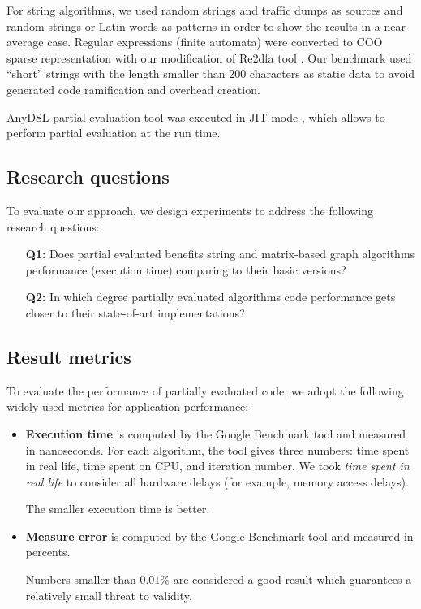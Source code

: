 \documentclass[conference]{IEEEtran}
\begin{document}
For string algorithms, we used random strings and traffic dumps as sources and random strings or Latin words as patterns in order to show the results in a near-average case. Regular expressions (finite automata) were converted to COO sparse representation with our modification of Re2dfa tool \cite{re2dfa}. Our benchmark used ``short'' strings with the length smaller than 200 characters as static data to avoid generated code ramification and overhead creation.

AnyDSL partial evaluation tool was executed in JIT-mode \cite{leissa2018anydsl}, which allows to perform partial evaluation at the run time.



\subsection{Research questions}

To evaluate our approach, we design experiments to address the following research questions:

\begin{itemize}
	\item[\textbf{Q1:}] Does partial evaluated benefits string and matrix-based graph algorithms performance (execution time) comparing to their basic versions?
	\item[\textbf{Q2:}] In which degree partially evaluated algorithms code performance gets closer to their state-of-art implementations?
\end{itemize}

\subsection{Result metrics}
To evaluate the performance of partially evaluated code, we adopt the following widely used metrics for application performance:
\begin{itemize}
	\item \textbf{Execution time} is computed by the Google Benchmark tool and measured in nanoseconds. For each algorithm, the tool gives three numbers: time spent in real life, time spent on CPU, and iteration number. We took \textit{time spent in real life} to consider all hardware delays (for example, memory access delays).
	
	The smaller execution time is better.
	
	\item \textbf{Measure error} is computed by the Google Benchmark tool and measured in percents. 
	
	Numbers smaller than $0.01\%$ are considered a good result which guarantees a relatively small threat to validity.

\end{itemize}
\end{document}
